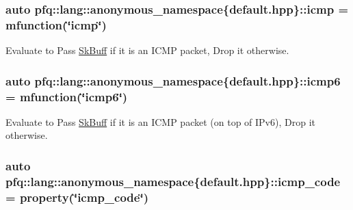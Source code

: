 \hypertarget{namespacepfq_1_1lang_1_1anonymous__namespace_02default_8hpp_03_a3becf93771a800904f002e39b1cc388f}{
\subsubsection[{icmp}]{\setlength{\rightskip}{0pt plus 5cm}auto pfq\+::lang\+::anonymous\+\_\+namespace\{default.\+hpp\}\+::icmp = {\bf mfunction}(\char`\"{}icmp\char`\"{})}}\label{namespacepfq_1_1lang_1_1anonymous__namespace_02default_8hpp_03_a3becf93771a800904f002e39b1cc388f}


Evaluate to {\ttfamily Pass} \hyperlink{structpfq_1_1lang_1_1SkBuff}{Sk\+Buff} if it is an I\+C\+M\+P packet, {\ttfamily Drop} it otherwise. 

\hypertarget{namespacepfq_1_1lang_1_1anonymous__namespace_02default_8hpp_03_a8fda9498af823eec4f9f8d81d4a171d5}{
\subsubsection[{icmp6}]{\setlength{\rightskip}{0pt plus 5cm}auto pfq\+::lang\+::anonymous\+\_\+namespace\{default.\+hpp\}\+::icmp6 = {\bf mfunction}(\char`\"{}icmp6\char`\"{})}}\label{namespacepfq_1_1lang_1_1anonymous__namespace_02default_8hpp_03_a8fda9498af823eec4f9f8d81d4a171d5}


Evaluate to {\ttfamily Pass} \hyperlink{structpfq_1_1lang_1_1SkBuff}{Sk\+Buff} if it is an I\+C\+M\+P packet (on top of I\+Pv6), {\ttfamily Drop} it otherwise. 

\hypertarget{namespacepfq_1_1lang_1_1anonymous__namespace_02default_8hpp_03_a026262dd85de1db88a8303ed0f3dac18}{
\subsubsection[{icmp\+\_\+code}]{\setlength{\rightskip}{0pt plus 5cm}auto pfq\+::lang\+::anonymous\+\_\+namespace\{default.\+hpp\}\+::icmp\+\_\+code = {\bf property}(\char`\"{}icmp\+\_\+code\char`\"{})}}\label{namespacepfq_1_1lang_1_1anonymous__namespace_02default_8hpp_03_a026262dd85de1db88a8303ed0f3dac18}


